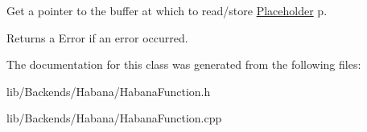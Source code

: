 Get a pointer to the buffer at which to read/store \hyperlink{classglow_1_1_placeholder}{Placeholder} {\ttfamily p}. \begin{DoxyReturn}{Returns}
a Error if an error occurred. 
\end{DoxyReturn}


The documentation for this class was generated from the following files\+:\begin{DoxyCompactItemize}
\item 
lib/\+Backends/\+Habana/Habana\+Function.\+h\item 
lib/\+Backends/\+Habana/Habana\+Function.\+cpp\end{DoxyCompactItemize}
